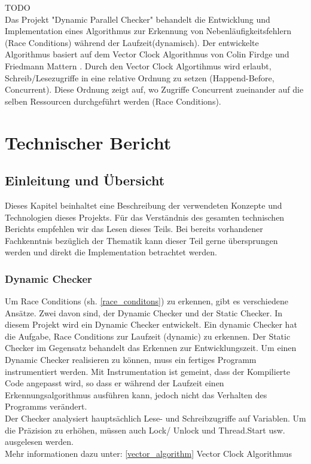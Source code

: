 \documentclass[10pt,a4paper]{article}
\begin{document}
\begin{flushleft}
TODO\\
Das Projekt "Dynamic Parallel Checker" behandelt die Entwicklung und Implementation eines Algorithmus zur Erkennung von Nebenläufigkeitsfehlern (Race Conditions) während der Laufzeit(dynamisch). Der entwickelte Algorithmus basiert auf dem Vector Clock Algorithmus von Colin Firdge und Friedmann Mattern \cite{acsc}. Durch den Vector Clock Algortihmus wird erlaubt, Schreib/Lesezugriffe in eine relative Ordnung zu setzen (Happend-Before, Concurrent). Diese Ordnung zeigt auf, wo Zugriffe Concurrent zueinander auf die selben Ressourcen durchgeführt werden (Race Conditions).
\end{flushleft}
\newpage
\section{Technischer Bericht}
\subsection{Einleitung und Übersicht}
Dieses Kapitel beinhaltet eine Beschreibung der verwendeten Konzepte und Technologien dieses Projekts. Für das Verständnis des gesamten technischen Berichts empfehlen wir das Lesen dieses Teils. Bei bereits vorhandener Fachkenntnis bezüglich der Thematik kann dieser Teil gerne übersprungen werden und direkt die Implementation betrachtet werden.
\subsubsection{Dynamic Checker}
\begin{flushleft}
Um Race Conditions (sh. \ref{race_conditons}) zu erkennen, gibt es verschiedene Ansätze. Zwei davon sind, der Dynamic Checker und der Static Checker. In diesem Projekt
wird ein Dynamic Checker entwickelt. Ein dynamic Checker hat die Aufgabe, Race Conditions zur Laufzeit (dynamic) zu erkennen. Der Static Checker
im Gegensatz behandelt das Erkennen zur Entwicklungszeit. Um einen Dynamic Checker realisieren zu können, muss ein fertiges Programm instrumentiert werden.
Mit Instrumentation ist gemeint, dass der Kompilierte Code angepasst wird, so dass er während der Laufzeit einen Erkennungsalgorithmus ausführen kann, jedoch nicht das Verhalten des Programms verändert.\\
Der Checker analysiert hauptsächlich Lese- und Schreibzugriffe auf Variablen. Um die Präzision zu erhöhen, müssen auch Lock/ Unlock und Thread.Start usw. ausgelesen werden.\\
Mehr informationen dazu unter: \ref{vector_algorithm} Vector Clock Algorithmus
\end{flushleft}
\end{document}
